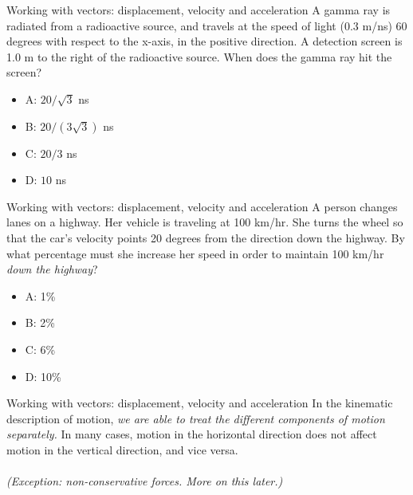 \documentclass{beamer}
\begin{document}
\begin{frame}{Working with vectors: displacement, velocity and acceleration}
A gamma ray is radiated from a radioactive source, and travels at the speed of light (0.3 m/ns) 60 degrees with respect to the x-axis, in the positive direction.  A detection screen is 1.0 m to the right of the radioactive source.  When does the gamma ray hit the screen?
\begin{itemize}
\item A: $20/\sqrt{3}$ ns
\item B: $20/(3\sqrt{3})$ ns
\item C: $20/3$ ns
\item D: $10$ ns
\end{itemize}
\end{frame}

\begin{frame}{Working with vectors: displacement, velocity and acceleration}
A person changes lanes on a highway.  Her vehicle is traveling at 100 km/hr.  She turns the wheel so that the car's velocity points 20 degrees from the direction down the highway.  By what percentage must she increase her speed in order to maintain 100 km/hr \textit{down the highway}?
\begin{itemize}
\item A: 1\%
\item B: 2\%
\item C: 6\%
\item D: 10\%
\end{itemize}
\end{frame}

\begin{frame}{Working with vectors: displacement, velocity and acceleration}
In the kinematic description of motion, \alert{\textit{we are able to treat the different components of motion separately.}}  In many cases, motion in the horizontal direction does not affect motion in the vertical direction, and vice versa.\\
\vspace{0.5cm}
\small
{} \\
\vspace{1cm}
\textit{(Exception: non-conservative forces.  More on this later.)}
\end{frame}
\end{document}
